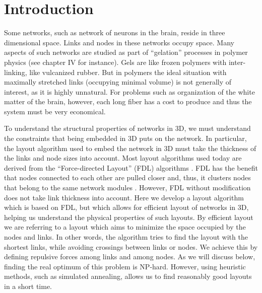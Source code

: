 \documentclass[linenumbers,endfloats,nofootinbib,preprint,floatfix,titlepage,superscriptaddress]{revtex4-1} %
\newcommand{\finV}[2]{#1}
\begin{document}
\finV{
\renewcommand{\citep}[1]{}
}{
\maketitle
}


\tableofcontents


\section{Introduction}
Some networks, such as network of neurons in the brain, reside in three dimensional space. 
Links and nodes in these networks occupy space. 
Many aspects of such networks are studied  as part of ``gelation'' processes in polymer physics (see \citep{de1979scaling} chapter IV for instance). 
Gels are like frozen polymers with inter-linking, like vulcanized rubber. But in polymers the ideal situation with maximally stretched links (occupying minimal volume) is not generally of interest, as it is highly unnatural. 
For problems such as organization of the white matter of the brain, however, each long fiber has a cost to produce and thus the system must be very economical.

To understand the structural properties of networks in 3D, we must understand the constraints that being embedded in 3D puts on the network. 
In particular, the layout algorithm used to embed the network in 3D must take the thickness of the links and node sizes into account. 
Most layout algorithms used today are derived from the ``Force-directed Layout'' (FDL) algorithms \citep{davidson1996drawing,kamada1989algorithm}. 
FDL has the benefit that nodes connected to each other are pulled closer and, thus, it clusters nodes that belong to the same network modules \citep{noack2009modularity}. 
However, FDL without modification does not take link thickness into account. 
Here we develop a layout algorithm which is based on FDL, but which allows for efficient layout of networks in 3D, helping us understand the physical properties of such layouts.
By efficient layout we are referring to a layout which aims to minimize the space occupied by the nodes and links. 
In other words, the algorithm tries to find the layout with the shortest links, while avoiding crossings between links or nodes.
We achieve this by defining repulsive forces among links and among nodes. 
As we will discuss below, finding the real optimum of this problem is NP-hard. 
However, using heuristic methods, such as simulated annealing, allows us to find reasonably good layouts in a short time.  
\end{document}
